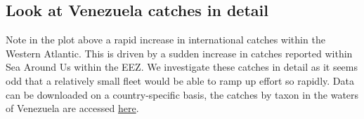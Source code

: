 \documentclass[
]{article}
\begin{document}
\subsection{Look at Venezuela catches in
detail}\label{look-at-venezuela-catches-in-detail}

Note in the plot above a rapid increase in international catches within
the Western Atlantic. This is driven by a sudden increase in catches
reported within Sea Around Us within the EEZ. We investigate these
catches in detail as it seems odd that a relatively small fleet would be
able to ramp up effort so rapidly. Data can be downloaded on a
country-specific basis, the catches by taxon in the waters of Venezuela
are accessed
\href{https://www.seaaroundus.org/data/\#/eez/862?chart=catch-chart&dimension=taxon&measure=tonnage&limit=10}{here}.
\end{document}
